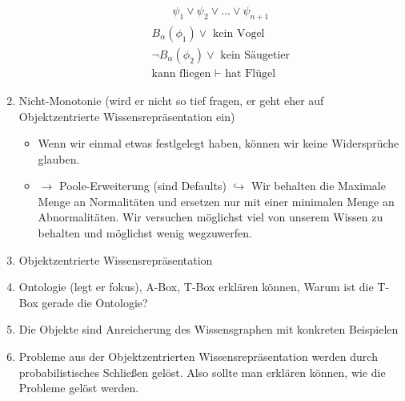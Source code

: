 \documentclass[runningheads,deutsch]{llncs}
\begin{document}
\begin{enumerate}
\begin{itemize}
\begin{align*}
            \hline
            \psi_1 \lor \psi_2 \lor \dots \lor \psi_{n+1}
        \end{align*}
        \begin{align*}
            B_\alpha(\phi_1) \lor \text{ kein Vogel} \\
            \lnot B_\alpha(\phi_2) \lor \text{ kein Säugetier} \\
            \text{kann fliegen } \vdash \text{ hat Flügel}
        \end{align*}
    \end{itemize}
    \item Nicht-Monotonie (wird er nicht so tief fragen, er geht eher auf Objektzentrierte Wissensrepräsentation ein)
    \begin{itemize}
        \item Wenn wir einmal etwas festlgelegt haben, können wir keine Widersprüche glauben. 
        \item $\rightarrow$ Poole-Erweiterung (sind Defaults) $\hookrightarrow$ Wir behalten die Maximale Menge an Normalitäten und ersetzen nur mit einer minimalen Menge an Abnormalitäten. Wir versuchen möglichst viel von unserem Wissen zu behalten und möglichst wenig wegzuwerfen.
    \end{itemize}
    \item Objektzentrierte Wissensrepräsentation
    \item Ontologie (legt er fokus), A-Box, T-Box erklären können, Warum ist die T-Box gerade die Ontologie?
    \item Die Objekte sind Anreicherung des Wissensgraphen mit konkreten Beispielen
    \item Probleme aus der Objektzentrierten Wissensrepräsentation werden durch probabilistisches Schließen gelöst. Also sollte man erklären können, wie die Probleme gelöst werden.
\end{enumerate}
\end{document}
